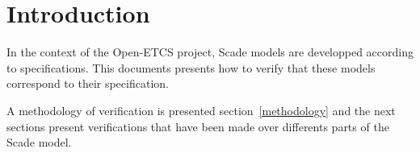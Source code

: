 \section{Introduction}
In the context of the Open-ETCS project, Scade models are developped
according to specifications. This documents presents how to verify
that these models correspond to their specification.

A methodology of verification is presented section~\ref{methodology}
and the next sections present verifications that have been made over
differents parts of the Scade model.

